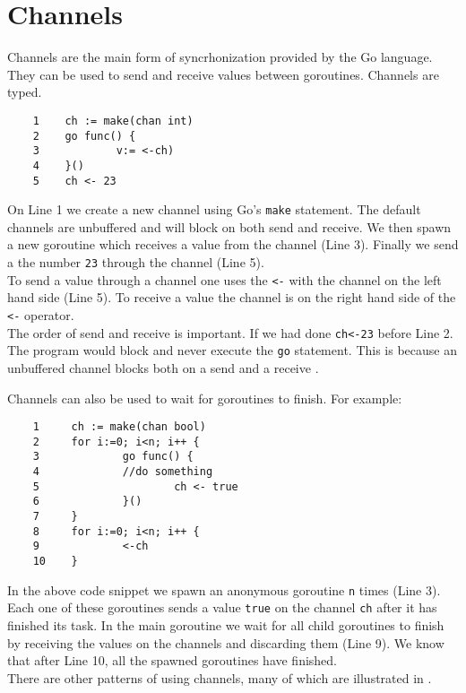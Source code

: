 \documentclass[8pt, twocolumn]{article}
\begin{document}
\section{Channels}
Channels are the main form of syncrhonization provided by the Go
language. They can be used to send and receive values between
goroutines. Channels are typed.
\begin{verbatim}
    1    ch := make(chan int)                         
    2    go func() {
    3            v:= <-ch)
    4    }()
    5    ch <- 23  
\end{verbatim}
On Line 1 we create a new channel using Go's \verb=make=
statement. The default channels are unbuffered and will block on both
send and receive. We then spawn a new goroutine which receives a value
from the channel (Line 3). Finally we send a the number \verb=23=
through the channel (Line 5).\\

To send a value through a channel one uses the \verb=<-= with
the channel on the left hand side (Line 5). To receive a value the
channel is on the right hand side of the \verb=<-= operator. \\

The order of send and receive is important. If we had done
\verb=ch<-23= before Line 2. The program would block and never execute
the \verb=go= statement. This is because an unbuffered channel blocks
both on a send and a receive \cite{effectivego}.

Channels can also be used to wait for goroutines to finish. For
example:
\begin{verbatim}
    1     ch := make(chan bool)
    2     for i:=0; i<n; i++ {
    3             go func() {
    4             //do something
    5                     ch <- true
    6             }()
    7     }
    8     for i:=0; i<n; i++ {
    9             <-ch 
    10    } 
\end{verbatim}
In the above code snippet we spawn an anonymous goroutine \verb=n=
times (Line 3). Each one of these goroutines sends a value \verb=true=
on the channel \verb=ch= after it has finished its task. In the main
goroutine we wait for all child goroutines to finish by receiving the
values on the channels and discarding them (Line 9). We know that
after Line 10, all the spawned goroutines have finished.\\

There are other patterns of using channels, many of
which are illustrated in \cite{effectivego}.
\end{document}
